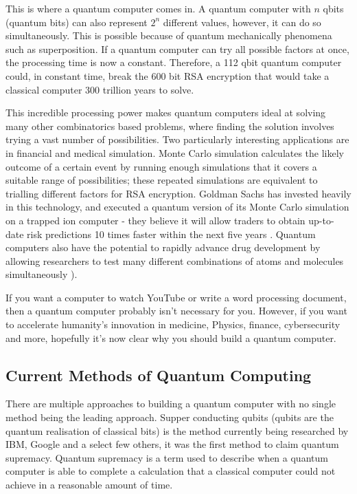 This is where a quantum computer comes in. A quantum computer with $n$ qbits (quantum bits) can also represent $2^n$ different values, however, it can do so simultaneously. This is possible because of quantum mechanically phenomena such as superposition. If a quantum computer can try all possible factors at once, the processing time is now a constant. Therefore, a 112 qbit quantum computer could, in constant time, break the 600 bit RSA encryption that would take a classical computer 300 trillion years to solve.

This incredible processing power makes quantum computers ideal at solving many other combinatorics based problems, where finding the solution involves trying a vast number of possibilities. Two particularly interesting applications are in financial and medical simulation. Monte Carlo simulation calculates the likely outcome of a certain event by running enough simulations that it covers a suitable range of possibilities; these repeated simulations are equivalent to trialling different factors for RSA encryption. Goldman Sachs has invested heavily in this technology, and executed a quantum version of its Monte Carlo simulation on a trapped ion computer - they believe it will allow traders to obtain up-to-date risk predictions 10 times faster within the next five years \cite{Giurgica_Tiron_2022}. Quantum computers also have the potential to rapidly advance drug development by allowing researchers to test many different combinations of atoms and molecules simultaneously \cite{bova2021commercial}).

If you want a computer to watch YouTube or write a word processing document, then a quantum computer probably isn't necessary for you. However, if you want to accelerate humanity's innovation in medicine, Physics, finance, cybersecurity and more, hopefully it's now clear why you should build a quantum computer.

\subsection{Current Methods of Quantum Computing}
There are multiple approaches to building a quantum computer with no single method being the leading approach.
Supper conducting qubits (qubits are the quantum realisation of classical bits) is the method currently being researched by IBM, Google and a select few others, it was the first method to claim quantum supremacy. \cite{gibney_hello_2019}
Quantum supremacy is a term used to describe when a quantum computer is able to complete a calculation that a classical computer could not achieve in a reasonable amount of time. 


